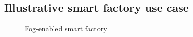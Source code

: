 \documentclass{iosart2c}
\begin{document}
\subsection{Illustrative smart factory use case}
\label{sec:distribution_use_case}

\begin{figure}
	\centering
	\caption{Fog-enabled smart factory}
	\label{fig:usecase}
\end{figure}
\end{document}

